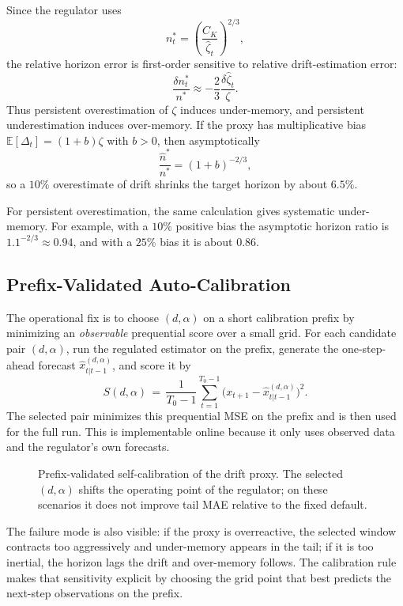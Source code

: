Since the regulator uses
\[
  n_t^* = \left(\frac{C_K}{\widehat\zeta_t}\right)^{2/3},
\]
the relative horizon error is first-order sensitive to relative drift-estimation
error:
\[
  \frac{\delta n_t^*}{n^*} \approx -\frac{2}{3}\frac{\delta \widehat\zeta_t}{\zeta}.
\]
Thus persistent overestimation of $\zeta$ induces under-memory, and persistent
underestimation induces over-memory. If the proxy has multiplicative bias
$\mathbb E[\Delta_t]=(1+b)\zeta$ with $b>0$, then asymptotically
\[
  \frac{\widehat n^*}{n^*} = (1+b)^{-2/3},
\]
so a $10\%$ overestimate of drift shrinks the target horizon by about $6.5\%$.



For persistent overestimation, the same calculation gives systematic under-memory.
For example, with a $10\%$ positive bias the asymptotic horizon ratio is
$1.1^{-2/3} \approx 0.94$, and with a $25\%$ bias it is about $0.86$.

\subsection{Prefix-Validated Auto-Calibration}

The operational fix is to choose $(d,\alpha)$ on a short calibration prefix by
minimizing an \emph{observable} prequential score over a small grid. For each
candidate pair $(d,\alpha)$, run the regulated estimator on the prefix,
generate the one-step-ahead forecast $\hat x_{t|t-1}^{(d,\alpha)}$, and score it by
\[
  S(d,\alpha)
  \,=\,
  \frac{1}{T_0-1}\sum_{t=1}^{T_0-1}
  \bigl(x_{t+1} - \hat x_{t|t-1}^{(d,\alpha)}\bigr)^2.
\]
The selected pair minimizes this prequential MSE on the prefix and is then used
for the full run. This is implementable online because it only uses observed
data and the regulator's own forecasts.



\begin{figure}[!htbp]
\centering
{}
\caption{Prefix-validated self-calibration of the drift proxy. The selected
$(d,\alpha)$ shifts the operating point of the regulator; on these scenarios it
does not improve tail MAE relative to the fixed default.}
\label{fig:zeta_self_calibration}
\end{figure}

The failure mode is also visible: if the proxy is overreactive, the selected
window contracts too aggressively and under-memory appears in the tail; if it is
too inertial, the horizon lags the drift and over-memory follows. The calibration
rule makes that sensitivity explicit by choosing the grid point that best
predicts the next-step observations on the prefix.

